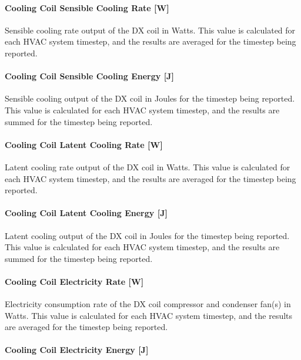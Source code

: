 \paragraph{Cooling Coil Sensible Cooling Rate {[}W{]}}

Sensible cooling rate output of the DX coil in Watts. This value is calculated for each HVAC system timestep, and the results are averaged for the timestep being reported.

\paragraph{Cooling Coil Sensible Cooling Energy {[}J{]}}

Sensible cooling output of the DX coil in Joules for the timestep being reported. This value is calculated for each HVAC system timestep, and the results are summed for the timestep being reported.

\paragraph{Cooling Coil Latent Cooling Rate {[}W{]}}

Latent cooling rate output of the DX coil in Watts. This value is calculated for each HVAC system timestep, and the results are averaged for the timestep being reported.

\paragraph{Cooling Coil Latent Cooling Energy {[}J{]}}

Latent cooling output of the DX coil in Joules for the timestep being reported. This value is calculated for each HVAC system timestep, and the results are summed for the timestep being reported.

\paragraph{Cooling Coil Electricity Rate {[}W{]}}

Electricity consumption rate of the DX coil compressor and condenser fan(s) in Watts. This value is calculated for each HVAC system timestep, and the results are averaged for the timestep being reported.

\paragraph{Cooling Coil Electricity Energy {[}J{]}}

